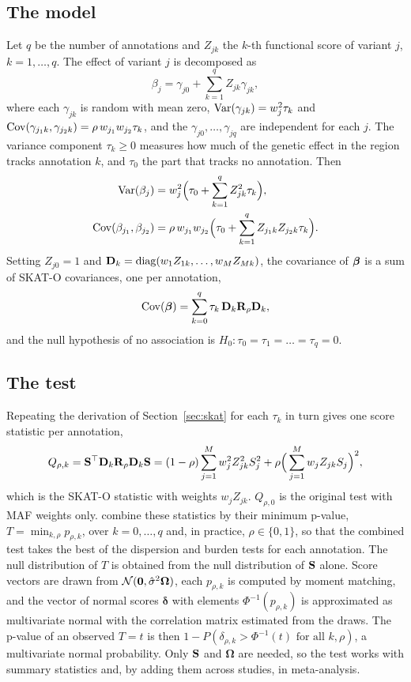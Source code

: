 \subsection{The model}

Let $q$ be the number of annotations and $Z_{jk}$ the $k$-th functional score of variant $j$, $k=1,\dots,q$. The effect of variant $j$ is decomposed as
\begin{equation}
  \beta_j = \gamma_{j0} + \sum_{k=1}^q Z_{jk}\gamma_{jk} ,
\end{equation}
where each $\gamma_{jk}$ is random with mean zero, $\operatorname{Var}(\gamma_{jk})=w_j^2\tau_k$ and $\operatorname{Cov}(\gamma_{j_1k},\gamma_{j_2k})=\rho\,w_{j_1}w_{j_2}\tau_k$, and the $\gamma_{j0},\dots,\gamma_{jq}$ are independent for each $j$. The variance component $\tau_k\geq 0$ measures how much of the genetic effect in the region tracks annotation $k$, and $\tau_0$ the part that tracks no annotation. Then
\begin{align}
  \operatorname{Var}(\beta_j) &= w_j^2\Big(\tau_0+\sum_{k=1}^q Z_{jk}^2\tau_k\Big), \\
  \operatorname{Cov}(\beta_{j_1},\beta_{j_2}) &= \rho\,w_{j_1}w_{j_2}\Big(\tau_0+\sum_{k=1}^q Z_{j_1k}Z_{j_2k}\tau_k\Big).
\end{align}
Setting $Z_{j0}=1$ and $\mathbf{D}_k=\operatorname{diag}(w_1Z_{1k},\dots,w_MZ_{Mk})$, the covariance of $\boldsymbol{\beta}$ is a sum of SKAT-O covariances, one per annotation,
\begin{equation}
  \operatorname{Cov}(\boldsymbol{\beta}) = \sum_{k=0}^q \tau_k\,\mathbf{D}_k\mathbf{R}_\rho\mathbf{D}_k ,
\end{equation}
and the null hypothesis of no association is $H_0:\tau_0=\tau_1=\dots=\tau_q=0$.

\subsection{The test}

Repeating the derivation of Section~\ref{sec:skat} for each $\tau_k$ in turn gives one score statistic per annotation,
\begin{equation}
  Q_{\rho,k} = \mathbf{S}^\top\mathbf{D}_k\mathbf{R}_\rho\mathbf{D}_k\mathbf{S} = (1-\rho)\sum_{j=1}^M w_j^2Z_{jk}^2S_j^2 + \rho\Big(\sum_{j=1}^M w_jZ_{jk}S_j\Big)^2 ,
\end{equation}
which is the SKAT-O statistic with weights $w_jZ_{jk}$. $Q_{\rho,0}$ is the original test with MAF weights only. \citet{he2017} combine these statistics by their minimum p-value, $T=\min_{k,\rho}p_{\rho,k}$, over $k=0,\dots,q$ and, in practice, $\rho\in\{0,1\}$, so that the combined test takes the best of the dispersion and burden tests for each annotation. The null distribution of $T$ is obtained from the null distribution of $\mathbf{S}$ alone. Score vectors are drawn from $\mathcal{N}(\mathbf{0},\hat\sigma^2\boldsymbol{\Omega})$, each $p_{\rho,k}$ is computed by moment matching, and the vector of normal scores $\boldsymbol\delta$ with elements $\Phi^{-1}(p_{\rho,k})$ is approximated as multivariate normal with the correlation matrix estimated from the draws. The p-value of an observed $T=t$ is then $1-P(\delta_{\rho,k}>\Phi^{-1}(t)\text{ for all }k,\rho)$, a multivariate normal probability. Only $\mathbf{S}$ and $\boldsymbol{\Omega}$ are needed, so the test works with summary statistics and, by adding them across studies, in meta-analysis.

